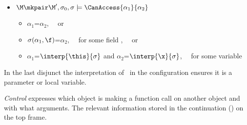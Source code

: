 \begin{definition}[%
Permission]  \label{def:valid:assertion:access}
\begin{itemize}
\item
$\M\mkpair \M', \sigma_0 , \sigma \models  \CanAccess{\alpha_1}{\alpha_2}$  \IFF  
\begin{itemize}
\item
$\alpha_1$=$\alpha_{2}$, \ \ or
\item
$\sigma(\alpha_1,\f) $=${\alpha_2}$, \  \ for some field ,  \ \ or
\item
${\alpha_1}$=$\interp {\this} {\sigma}$ and
  ${\alpha_2}$=$\interp {\x} {\sigma}$, \ \ for some variable \x
\end{itemize}
\end{itemize}
\end{definition}



\noindent 
In the last disjunct the interpretation of \x\ in the configuration ensures it is a parameter or local variable.

\vspace{.2cm} \noindent
\textit{Control} expresses which object is making a function call on another object and
with what arguments. The relevant information
 stored in the continuation () on the top frame.

